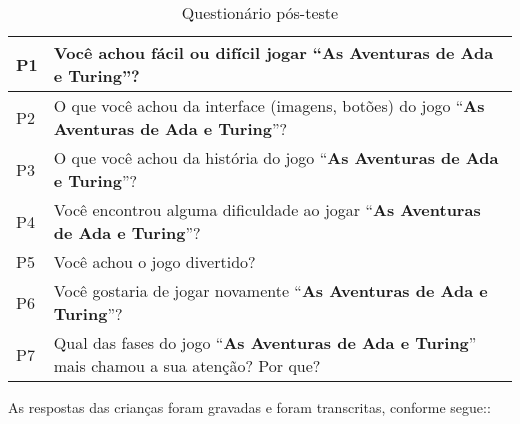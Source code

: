\begin{table}[H]
\centering
\caption{Questionário pós-teste}
\label{tab:entrevista}
\begin{tabular}{|l|p{14cm}|}
\hline
P1 & Você achou fácil ou difícil jogar “\textbf{As Aventuras de Ada e Turing}”?                 \\ \hline
P2 & O que você achou da interface (imagens, botões) do jogo “\textbf{As Aventuras de Ada e Turing}”?               \\ \hline
P3 & O que você achou da história do jogo “\textbf{As Aventuras de Ada e Turing}”?   \\ \hline
P4 & Você encontrou alguma dificuldade ao jogar “\textbf{As Aventuras de Ada e Turing}”? \\ \hline
P5 & Você achou o jogo divertido?  \\ \hline
P6 & Você gostaria de jogar novamente “\textbf{As Aventuras de Ada e Turing}”?       \\ \hline
P7 & Qual das fases do jogo “\textbf{As Aventuras de Ada e Turing}” mais chamou a sua atenção? Por que?                   \\ \hline
\end{tabular}
\end{table}

As respostas das crianças foram gravadas e foram transcritas, conforme segue::

